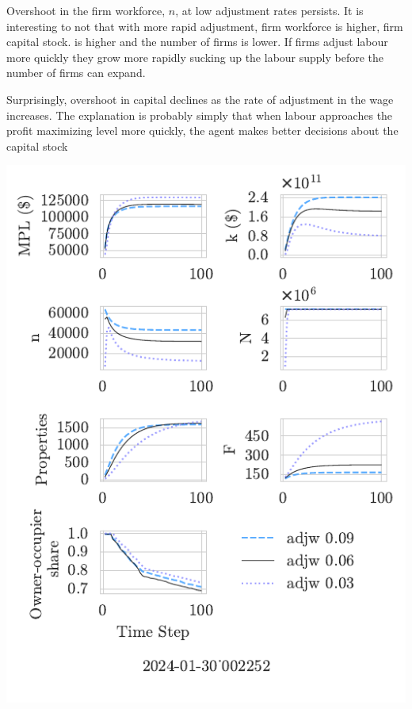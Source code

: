 Overshoot in the firm workforce, $n$, at low adjustment rates persists. It is interesting to not that with more rapid adjustment,  firm workforce is higher, firm capital stock. is higher and the number of firms is lower. If firms adjust labour more quickly they grow more rapidly sucking  up the labour supply before the number of firms can expand. 

Surprisingly, overshoot in capital declines as the rate of adjustment in the wage increases. The explanation is probably simply that when labour approaches  the profit maximizing level more quickly, the agent makes better decisions about the capital stock



 \includegraphics[]{fig/Analysis/adjw-2024-01-30_002252.pdf}

